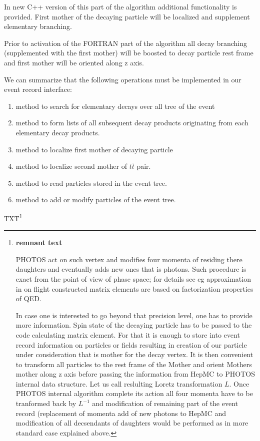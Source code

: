 \documentclass[]{Photos_interface_design}
\begin{document}
In new C++ version of this part of the algorithm additional functionality
is provided.
First mother of the decaying particle will be localized and supplement 
elementary branching. 

Prior to activation
of the FORTRAN part of the algorithm all decay branching 
(supplemented with the first 
mother) will be boosted to decay particle rest frame and first mother
will be oriented along z axis.

We can summarize that the following operations must be implemented
in our event record interface:
\begin{enumerate}
\item method to search for elementary decays over all tree of the event
\item method to form lists of all subsequent decay products originating from each elementary decay products.
\item method to localize first mother of decaying particle 
\item method to localize second mother of $t \bar t$ pair.
\item method to read  particles stored in the event tree.
\item method to add or modify particles of the event tree.
\end{enumerate}

TXT\footnote{ {\bf remnant text}  

PHOTOS act on such vertex and modifies four momenta of residing there daughters 
and eventually adds new ones that is photons. 
Such procedure is exact from the point of view of phase space; for details see eg  approximation in on flight constructed matrix elements are based
on factorization properties of QED. 

In case one is interested to go beyond that precision level, one has to  provide
more information. Spin state of the decaying particle has to be passed to the code calculating matrix element. For that it is enough to store into event record
information on particles or fields resulting in creation of
our particle under consideration that is mother for the decay vertex.
It is then convenient to transform all particles to the rest frame of the Mother
and orient Mothers mother along z axis before passing the information from HepMC to PHOTOS internal data structure. Let us call reslulting Loretz transformation $L$. Once PHOTOS internal algorithm complete
its action all four momenta have to be tranformed back by $L^{-1}$ and 
modification of remaining part of the event record (replacement of momenta
add of new photons to HepMC and modification of all decsendants of 
daughters would be performed as in more standard case explained above.
}
\end{document}
